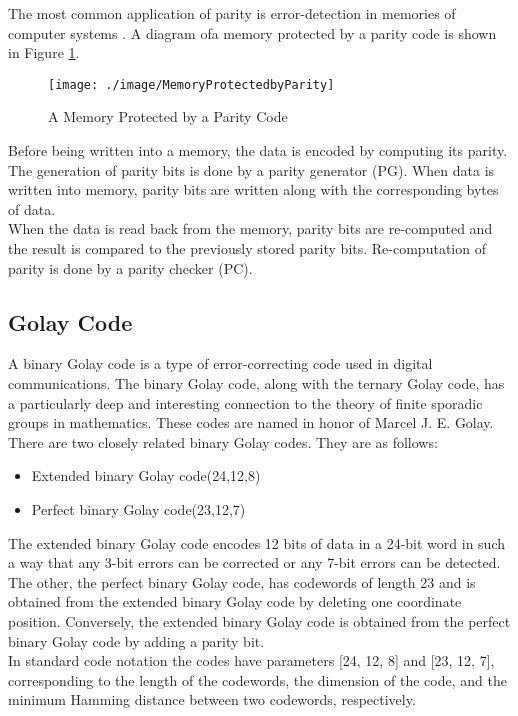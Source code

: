 \documentclass[12pt,a4paper]{report}
\begin{document}
  The most common application of parity is error-detection in memories of computer systems \cite{Dubrova}. A diagram ofa memory protected by a parity code is shown in Figure \ref{fig:MemoryProtectedbyParity}.\\
  
  \begin{figure}
   \centering
   \texttt{[image: ./image/MemoryProtectedbyParity]}
   \caption{A Memory Protected by a Parity Code}
   \label{fig:MemoryProtectedbyParity}
   \end{figure}
   
Before being written into a memory, the data is encoded by computing its
parity. The generation of parity bits is done by a parity generator (PG). When data is written into memory, parity bits are written along with the corresponding bytes of data.\\

When the data is read back from the memory, parity bits are re-computed
and the result is compared to the previously stored parity bits. Re-computation of parity is done by a parity checker (PC).
  
 \subsection{Golay Code}
 A binary Golay code\cite{mathworld} is a type of error-correcting code used in digital communications. The binary Golay code, along with the ternary Golay code, has a particularly deep and interesting connection to the theory of finite sporadic groups in mathematics. These codes are named in honor of Marcel J. E. Golay.\\
 There are two closely related binary Golay codes. They are as follows:
 \begin{itemize}
\item Extended binary Golay code(24,12,8)
\item Perfect binary Golay code(23,12,7)
 \end{itemize}
 The extended binary Golay code encodes 12 bits of data in a 24-bit word in such a way that any 3-bit errors can be corrected or any 7-bit errors can be detected.\\ 
 The other, the perfect binary Golay code, has codewords of length 23 and is obtained from the extended binary Golay code by deleting one coordinate position. Conversely, the extended binary Golay code is obtained from the perfect binary Golay code by adding a parity bit.\\
 In standard code notation the codes have parameters [24, 12, 8] and [23, 12, 7], corresponding to the length of the codewords, the dimension of the code, and the minimum Hamming distance between two codewords, respectively.
\end{document}
